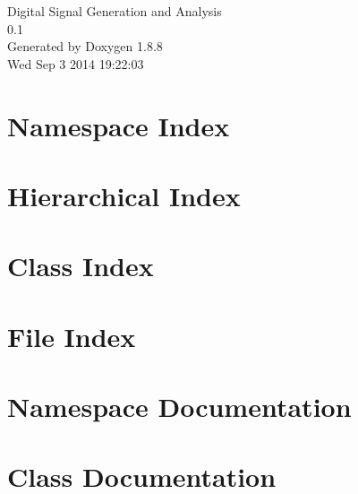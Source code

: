 \documentclass[twoside]{book}
\newcommand{\+}{\discretionary{\mbox{\scriptsize$\hookleftarrow$}}{}{}}
\newcommand{\clearemptydoublepage}{%
  \newpage{\pagestyle{empty}\cleardoublepage}%
}
\begin{document}
\hypersetup{pageanchor=false,
             bookmarks=true,
             bookmarksnumbered=true,
             pdfencoding=unicode
            }
\begin{titlepage}
\vspace*{7cm}
\begin{center}%
{\Large Digital Signal Generation and Analysis \\[1ex]\large 0.\+1 }\\
\vspace*{1cm}
{\large Generated by Doxygen 1.8.8}\\
\vspace*{0.5cm}
{\small Wed Sep 3 2014 19:22:03}\\
\end{center}
\end{titlepage}
\clearemptydoublepage
\tableofcontents
\clearemptydoublepage
{}
\hypersetup{pageanchor=true}

\chapter{Namespace Index}

\chapter{Hierarchical Index}

\chapter{Class Index}

\chapter{File Index}

\chapter{Namespace Documentation}



\chapter{Class Documentation}


















\end{document}
